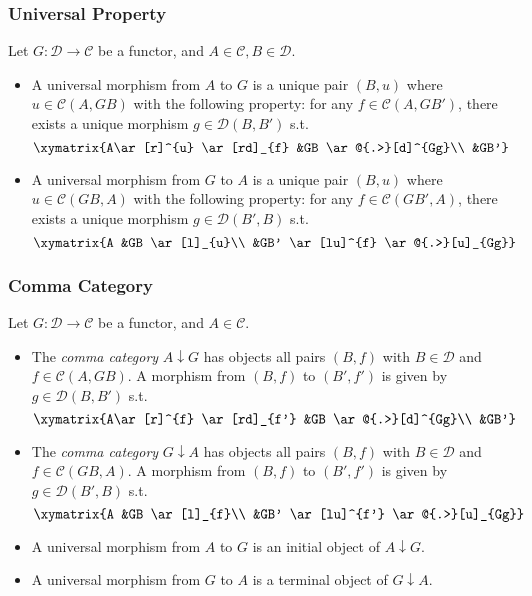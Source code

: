 \documentclass[UTF8,aspectratio=43,11pt,colorlinks,compress,openany]{beamer}%
\begin{document}
\begin{frame}\frametitle{Universal Property}
\setlength\abovedisplayskip{0pt}
\setlength\belowdisplayskip{0pt}
\begin{definition}
Let $G:\mathcal{D}\to\mathcal{C}$ be a functor, and $A\in\mathcal{C}, B\in\mathcal{D}$.
\begin{itemize}
	\item A universal morphism from $A$ to $G$ is a unique pair $(B,u)$ where $u\in\mathcal{C}(A,GB)$ with the following property: for any $f\in\mathcal{C}(A,GB')$, there exists a unique morphism $g\in\mathcal{D}(B,B')$ s.t.
\[
\xymatrix{A\ar[r]^{u} \ar[rd]_{f} &GB \ar@{.>}[d]^{Gg}\\
&GB'}
\]
	\item A universal morphism from $G$ to $A$ is a unique pair $(B,u)$ where $u\in\mathcal{C}(GB,A)$ with the following property: for any $f\in\mathcal{C}(GB',A)$, there exists a unique morphism $g\in\mathcal{D}(B',B)$ s.t.
\[
\xymatrix{A &GB \ar[l]_{u}\\
&GB' \ar[lu]^{f} \ar@{.>}[u]_{Gg}}
\]
\end{itemize}
\end{definition}
\end{frame}

\begin{frame}\frametitle{Comma Category}
\setlength\abovedisplayskip{0pt}
\setlength\belowdisplayskip{0pt}\vspace*{-1ex}\footnotesize
\begin{definition}
Let $G:\mathcal{D}\to \mathcal{C}$ be a functor, and $A\in\mathcal{C}$.
\begin{itemize}
	\item The \emph{comma category} $A\downarrow G$ has objects all pairs $(B,f)$ with $B\in\mathcal{D}$ and $f\in\mathcal{C}(A,GB)$. A morphism from $(B,f)$ to $(B',f')$ is given by $g\in\mathcal{D}(B,B')$ s.t.\vspace*{-1ex}
\[
\xymatrix{A\ar[r]^{f} \ar[rd]_{f'} &GB \ar@{.>}[d]^{Gg}\\
&GB'}
\]\vspace*{-3ex}
	\item The \emph{comma category} $G\downarrow A$ has objects all pairs $(B,f)$ with $B\in\mathcal{D}$ and $f\in\mathcal{C}(GB,A)$. A morphism from $(B,f)$ to $(B',f')$ is given by $g\in\mathcal{D}(B',B)$ s.t.\vspace*{-1ex}
\[
\xymatrix{A &GB \ar[l]_{f}\\
&GB' \ar[lu]^{f'} \ar@{.>}[u]_{Gg}}
\]
\end{itemize}
\end{definition}
\begin{itemize}
	\item A universal morphism from $A$ to $G$ is an initial object of $A\downarrow G$.
	\item A universal morphism from $G$ to $A$ is a terminal object of $G\downarrow A$.
\end{itemize}
\end{frame}
\end{document}
